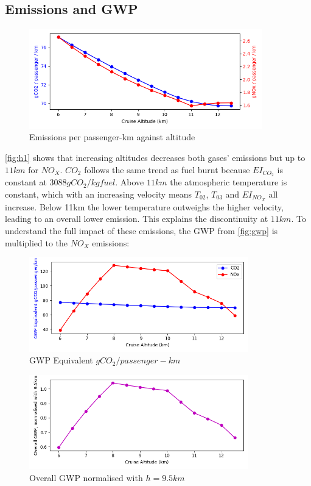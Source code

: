 \documentclass[12pt, a4paper]{article}
\begin{document}
\subsection{Emissions and GWP}
\begin{figure}[H]
	\centering
	\includegraphics[width=0.9\textwidth]{../Plots/h1}
	\caption{Emissions per passenger-km against altitude}
	\label{fig:h1}
\end{figure}
\autoref{fig:h1} shows that increasing altitudes decreases both gases' emissions but up to $11km$ for $NO_X$. $CO_2$ follows the same trend as fuel burnt because $EI_{CO_2}$ is constant at $3088gCO_2/kg fuel$. Above $11km$ the atmospheric temperature is constant, which with an increasing velocity means $T_{02}$, $T_{03}$ and $EI_{NO_X}$ all increase. Below 11km the lower temperature outweighs the higher velocity, leading to an overall lower emission. This explains the discontinuity at $11km$. To understand the full impact of these emissions, the GWP from \autoref{fig:gwp} is multiplied to the $NO_X$ emissions:
\begin{figure}[H]
	\centering
	\includegraphics[width=0.85\textwidth]{../Plots/h2}
	\caption{GWP Equivalent $gCO_2/passenger-km$}
	\label{fig:h2}
\end{figure}
\begin{figure}[H]
	\centering
	\includegraphics[width=0.85\textwidth]{../Plots/h3}
	\caption{Overall GWP normalised with $h=9.5km$}
	\label{fig:h3}
\end{figure}
\end{document}
